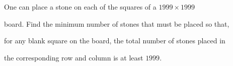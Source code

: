 One can place a stone on each of the squares of a $1999\times 1999$

 board. Find the minimum number of stones that must be placed so that, 

for any blank square on the board, the total number of stones placed in 

the corresponding row and column is at least $1999$.